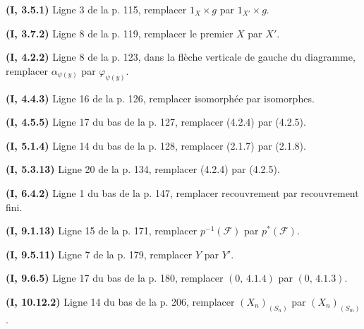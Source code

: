 \noindent\textbf{(I, 3.5.1)} Ligne 3 de la p. 115, remplacer $1_X\times g$
par $1_{X'}\times g$.

\noindent\textbf{(I, 3.7.2)} Ligne 8 de la p. 119, remplacer le premier $X$
par $X'$.

\noindent\textbf{(I, 4.2.2)} Ligne 8 de la p. 123, dans la flèche verticale de
gauche du diagramme, remplacer $\alpha_{\psi(y)}$ par $\varphi_{\psi(y)}$.

\noindent\textbf{(I, 4.4.3)} Ligne 16 de la p. 126, remplacer isomorphée par
isomorphes.

\noindent\textbf{(I, 4.5.5)} Ligne 17 du bas de la p. 127, remplacer (4.2.4)
par (4.2.5).

\noindent\textbf{(I, 5.1.4)} Ligne 14 du bas de la p. 128, remplacer (2.1.7)
par (2.1.8).

\noindent\textbf{(I, 5.3.13)} Ligne 20 de la p. 134, remplacer (4.2.4) par
(4.2.5).

\noindent\textbf{(I, 6.4.2)} Ligne 1 du bas de la p. 147, remplacer
recouvrement par recouvrement fini.

\noindent\textbf{(I, 9.1.13)} Ligne 15 de la p. 171, remplacer
$p^{-1}(\mathscr F)$ par $p^*(\mathscr F)$.

\noindent\textbf{(I, 9.5.11)} Ligne 7 de la p. 179, remplacer $Y$ par $Y'$.

\noindent\textbf{(I, 9.6.5)} Ligne 17 du bas de la p. 180, remplacer
$(0,\,4.1.4)$ par $(0,\,4.1.3)$.

\noindent\textbf{(I, 10.12.2)} Ligne 14 du bas de la p. 206, remplacer
$(X_n)_{(S_n)}$ par $(X_n)_{(S_m)}$.

\clearpage
